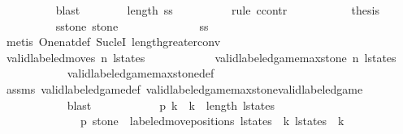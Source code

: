 \begin{isabellebody}
\ \ \ \ \ \ \ \ \isamarkupfalse%
\ blast\isanewline
\isanewline
\ \ \ \ \ \ \isamarkupfalse%
\ {\isachardoublequoteopen}length\ ss\ {\isasymge}\ {}{\isachardoublequoteclose}\isanewline
\ \ \ \ \ \ \isamarkupfalse%
\ {\isacharparenleft}rule\ ccontr{\isacharparenright}\isanewline
\ \ \ \ \ \ \ \ \isamarkupfalse%
\ {\isachardoublequoteopen}{\isasymnot}\ {\isacharquery}thesis{\isachardoublequoteclose}\isanewline
\ \ \ \ \ \ \ \ \isamarkupfalse%
\ {\isachardoublequoteopen}{\isacharquery}sstone\ stone\ {\isacharequal}\ {\isacharbrackleft}{\isacharbrackright}{\isachardoublequoteclose}\isanewline
\ \ \ \ \ \ \ \ \ \ \isamarkupfalse%
\ ss\isanewline
\ \ \ \ \ \ \ \ \ \ \isamarkupfalse%
\ {\isacharparenleft}metis\ One{\isacharunderscore}nat{\isacharunderscore}def\ Suc{\isacharunderscore}leI\ length{\isacharunderscore}greater{\isacharunderscore}{}{\isacharunderscore}conv{\isacharparenright}\isanewline
\isanewline
\ \ \ \ \ \ \ \ \isamarkupfalse%
\ {\isachardoublequoteopen}valid{\isacharunderscore}labeled{\isacharunderscore}moves\ n\ l{\isacharunderscore}states{\isachardoublequoteclose}\isanewline
\ \ \ \ \ \ \ \ \ \ \isamarkupfalse%
\ {\isacharbackquoteopen}valid{\isacharunderscore}labeled{\isacharunderscore}game{\isacharunderscore}max{\isacharunderscore}stone\ n\ l{\isacharunderscore}states{\isacharbackquoteclose}\isanewline
\ \ \ \ \ \ \ \ \ \ \isamarkupfalse%
\ valid{\isacharunderscore}labeled{\isacharunderscore}game{\isacharunderscore}max{\isacharunderscore}stone{\isacharunderscore}def\isanewline
\ \ \ \ \ \ \ \ \ \ \isamarkupfalse%
\ assms\ valid{\isacharunderscore}labeled{\isacharunderscore}game{\isacharunderscore}def\ valid{\isacharunderscore}labeled{\isacharunderscore}game{\isacharunderscore}max{\isacharunderscore}stone{\isacharunderscore}valid{\isacharunderscore}labeled{\isacharunderscore}game\isanewline
\ \ \ \ \ \ \ \ \ \ \isamarkupfalse%
\ blast\isanewline
\isanewline
\ \ \ \ \ \ \ \ \isamarkupfalse%
\ \isamarkupfalse%
\ p{}\ k\ \ {\isachardoublequoteopen}k\ {\isacharless}\ length\ l{\isacharunderscore}states\ {\isacharminus}\ {}{\isachardoublequoteclose}\isanewline
\ \ \ \ \ \ \ \ \ \ \ \ \ {\isachardoublequoteopen}{\isacharparenleft}{}{\isacharcomma}\ p{}{\isacharcomma}\ stone{\isacharparenright}\ {\isacharequal}\ labeled{\isacharunderscore}move{\isacharunderscore}positions\ {\isacharparenleft}l{\isacharunderscore}states\ {\isacharbang}\ k{\isacharparenright}\ {\isacharparenleft}l{\isacharunderscore}states\ {\isacharbang}\ {\isacharparenleft}k\ {\isacharplus}\ {}{\isacharparenright}{\isacharparenright}{\isachardoublequoteclose}\isanewline

\end{isabellebody}
